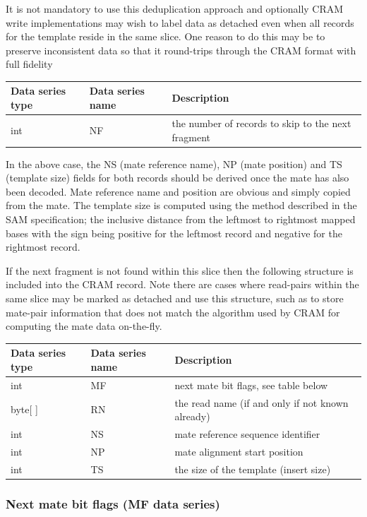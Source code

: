 \documentclass[a4paper]{article}
\begin{document}
It is not mandatory to use this deduplication approach and optionally CRAM write implementations may wish to label data as detached even when all records for the template reside in the same slice.
One reason to do this may be to preserve inconsistent data so that it round-trips through the CRAM format with full fidelity

\begin{tabular}{|>{\raggedright}p{68pt}|>{\raggedright}p{115pt}|>{\raggedright}p{228pt}|}
\hline
\textbf{Data series type} & \textbf{Data series name} & \textbf{Description}\tabularnewline
\hline
int & NF & the number of records to skip to the next fragment\tabularnewline
\hline
\end{tabular}

In the above case, the NS (mate reference name), NP (mate position) and TS (template size) fields for both records should be derived once the mate has also been decoded.
Mate reference name and position are obvious and simply copied from the mate.
The template size is computed using the method described in the SAM specification; the inclusive distance from the leftmost to rightmost mapped bases with the sign being positive for the leftmost record and negative for the rightmost record.

If the next fragment is not found within this slice then the following structure is included into the CRAM record.
Note there are cases where read-pairs within the same slice may be marked as detached and use this structure, such as to store mate-pair information that does not match the algorithm used by CRAM for computing the mate data on-the-fly.

\begin{tabular}{|>{\raggedright}p{66pt}|>{\raggedright}p{117pt}|>{\raggedright}p{228pt}|}
\hline
\textbf{Data series type} & \textbf{Data series name} & \textbf{Description}\tabularnewline
\hline
int & MF & next mate bit flags, see table below\tabularnewline
\hline
byte[ ] & RN & the read name (if and only if not known already)\tabularnewline
\hline
int & NS & mate reference sequence identifier \tabularnewline
\hline
int & NP & mate alignment start position \tabularnewline
\hline
int & TS & the size of the template (insert size)\tabularnewline
\hline
\end{tabular}

\subsubsection*{Next mate bit flags (MF data series)}
\end{document}
